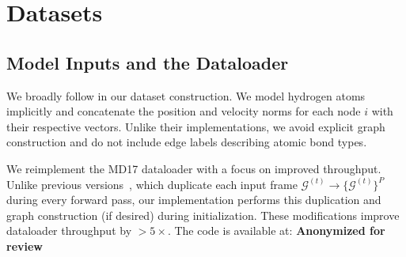 

\section{Datasets}
\label{sec:dataset_construction}
\subsection{Model Inputs and the Dataloader}
We broadly follow \cite{shi_learning_2021, xu_equivariant_2024} in our dataset construction. We model hydrogen atoms implicitly and concatenate the position and velocity norms for each node \(i\) with their respective vectors. Unlike their implementations, we avoid explicit graph construction and do not include edge labels describing atomic bond types.

We reimplement the MD17 dataloader with a focus on improved throughput. Unlike previous versions~\cite{huang_equivariant_2022, xu_equivariant_2024}, which duplicate each input frame \(\mathcal{G}^{(t)} \to \{\mathcal{G}^{(t)}\}^{P}\) during every forward pass, our implementation performs this duplication and graph construction (if desired) during initialization. These modifications improve dataloader throughput by \(>5 \times\). The code is available at: \textbf{Anonymized  for review}

